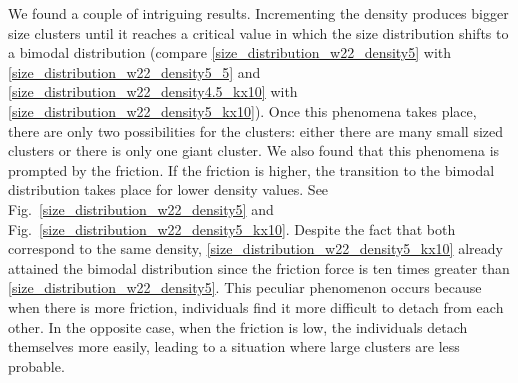 We found a couple of intriguing results. Incrementing the density produces bigger size clusters until it reaches a critical value in which the size distribution shifts to a bimodal distribution (compare \ref{size_distribution_w22_density5} with \ref{size_distribution_w22_density5_5} and \ref{size_distribution_w22_density4.5_kx10} with \ref{size_distribution_w22_density5_kx10}). Once this phenomena takes place, there are only two possibilities for the clusters: either there are many small sized clusters or there is only one giant cluster. We also found that this phenomena is prompted by the friction. If the friction is higher, the transition to the bimodal distribution takes place for lower density values. See Fig.~\ref{size_distribution_w22_density5} and Fig.~\ref{size_distribution_w22_density5_kx10}. Despite the fact that both correspond to the same density,  \ref{size_distribution_w22_density5_kx10} already attained the bimodal distribution since the friction force is ten times greater than \ref{size_distribution_w22_density5}. This peculiar phenomenon occurs because when there is more friction, individuals find it more difficult to detach from each other. In the opposite case, when the friction is low, the individuals detach themselves more easily, leading to a situation where large clusters are less probable.

